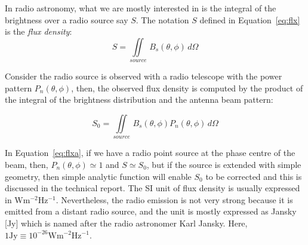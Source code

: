  In radio astronomy, what we are mostly interested in is the integral of the brightness over a radio source say $S$. The notation $S$ defined in Equation~\ref{eq:flx}
 is the \emph{flux density}: 
\begin{equation} \label{eq:flx}
 S = \iint\limits_{source} \, B_{s}(\theta,\phi) \, d\varOmega
\end{equation}

\noindent Consider the radio source is observed with a radio telescope with the power pattern $P_{n}(\theta, \phi)$, then, 
the observed flux density is computed by the product of the integral of the brightness distribution and the antenna beam pattern:

\begin{equation} \label{eq:flxa}
 S_{0} = \iint\limits_{source} \, B_{s}(\theta,\phi)P_{n}(\theta,\phi) \, d\varOmega
\end{equation}

\noindent In Equation~\ref{eq:flxa}, if we have a radio point source at the phase centre of the beam, then, $P_{n}(\theta,\phi)\simeq 1$ and $S \simeq S_0$, but if the 
source is extended with simple geometry, then simple analytic function will enable $S_0$ to be corrected and this is discussed in the \cite{Gaylard2012} technical report. 
The SI unit of flux density is usually expressed in $\mathrm{Wm^{-2}Hz^{-1}}$. Nevertheless, the radio emission is not very strong because it is emitted from a distant radio source,
and the unit is mostly expressed as Jansky [Jy] which is named after the radio astronomer Karl Jansky. Here,  $1 \mathrm{Jy} \equiv \mathrm{10^{-26} Wm^{-2}Hz^{-1}}$.


